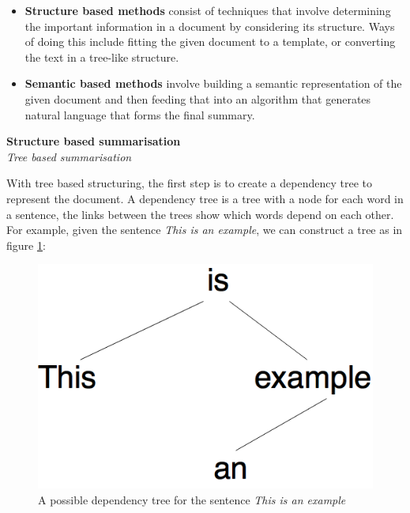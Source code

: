 \documentclass[12pt]{article}
\begin{document}
\begin{itemize}
	\item \textbf{Structure based methods} consist of techniques that involve determining the important information in a document by considering its structure\cite{abstractiveTechniquesOriginal}. Ways of doing this include fitting the given document to a template, or converting the text in a tree-like structure. \\
	\item \textbf{Semantic based methods} involve building a semantic representation of the given document and then feeding that into an algorithm that generates natural language that forms the final summary. \\
\end{itemize}

\textbf{Structure based summarisation} \\

\emph{Tree based summarisation}

With tree based structuring, the first step is to create a dependency tree to represent the document. A dependency tree is a tree with a node for each word in a sentence, the links between the trees show which words depend on each other. For example, given the sentence \emph{This is an example}, we can construct a tree as in figure \ref{dependencyTree}:

\begin{figure}[ht!]
  \centering
    \includegraphics[scale=0.4]{DependencyTree.png}
   \caption[An example of a Dependency Tree]{A possible dependency tree for the sentence \emph{This is an example}}
   \label{dependencyTree}
\end{figure}
\end{document}
